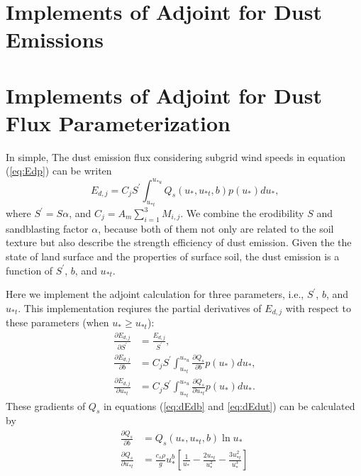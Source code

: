 \section{Implements of Adjoint for Dust Emissions}
\section{Implements of Adjoint for Dust Flux Parameterization}

   In simple, The dust emission flux considering subgrid wind speeds in equation 
   (\ref{eq:Edp}) can be writen
   \begin{equation}
   E_{d,j} = C_j S^\prime \int^{u_{*u}}_{u_{*t}} Q_s(u_*,u_{*t},b) p(u_*) d u_* \mbox{,}
   \end{equation}
   where $S^\prime = S \alpha$, and $C_j=A_m \displaystyle \sum_{i=1}^3 M_{i,j}$. We combine
   the erodibility $S$ and sandblasting factor $\alpha$, because both of them not only are 
   related to the soil texture but also describe the strength efficiency of dust emission. 
   Given the the state of land surface and the properties of surface soil, the dust emission
   is a function of $S^\prime$, $b$, and $u_{*t}$. 

   Here we implement the adjoint calculation for three parameters, i.e., 
   $S^\prime$, $b$, and $u_{*t}$. This implementation reqiures the partial
   derivatives of $E_{d,j}$ with respect to these parameters (when 
   $u_* \geq u_{*t}$): 
   \begingroup
   \allowdisplaybreaks
   \begin{align}
     \frac{\partial E_{d,j}}{\partial S^\prime} 
       &= \frac{E_{d,j}}{S^\prime}\mbox{,} \\
     \frac{\partial E_{d,j}}{\partial b} 
       &= C_j S^\prime \int^{u_{*u}}_{u_{*t}} 
          \frac{\partial Q_s}{\partial b} p(u_*) d u_* \mbox{,} \label{eq:dEdb}\\
     \frac{\partial E_{d,j}}{\partial u_{*t}}
       & = C_j S^\prime \int^{u_{*u}}_{u_{*t}} 
          \frac{\partial Q_s}{\partial u_{*t}} p(u_*) d u_* \mbox{.} \label{eq:dEdut}
   \end{align}
   \endgroup
   These gradients of $Q_s$ in equations (\ref{eq:dEdb} and \ref{eq:dEdut}) can be 
   calculated by
   \begingroup
   \allowdisplaybreaks
   \begin{align}
   \frac{\partial Q_s}{\partial b} &= Q_s(u_*,u_{*t},b) \ln{u_*} \\
   \frac{\partial Q_s}{\partial u_{*t}} &=\frac{c_s \rho}{g} u_*^b
         \left[\frac{1}{u_*} - \frac{2u_{*t}}{u_*^2} 
         - \frac{3u_{*t}^2}{u_*^3}\right] 
   \end{align}
   \endgroup
